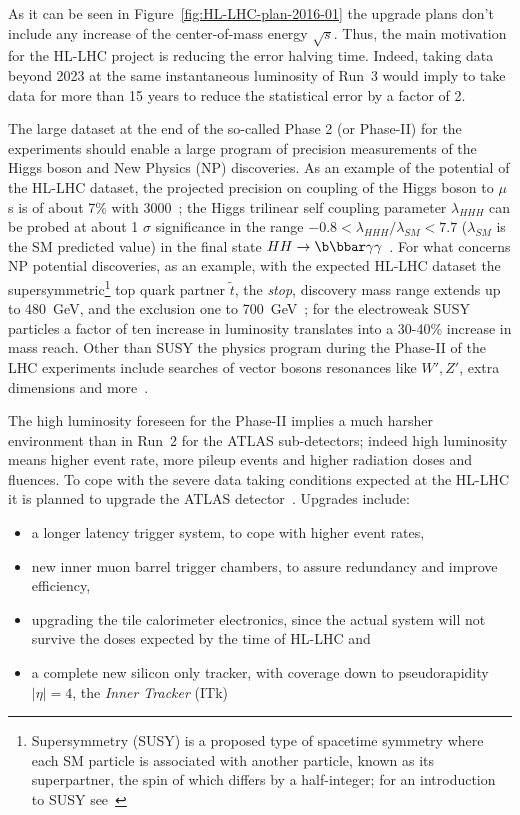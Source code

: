 As it can be seen in Figure~\ref{fig:HL-LHC-plan-2016-01} the upgrade plans don't include any increase 
of the center-of-mass energy $\sqrt{s}$. Thus, the main motivation for the HL-LHC project is 
reducing the error halving time. Indeed, taking data beyond 2023 at the same instantaneous luminosity of 
Run~3 would imply  to take data for more than 15 years to reduce the statistical error by a factor of 2.

The large dataset at the end of the so-called Phase 2 (or {\it} Phase-II) for the experiments should enable 
a  large program of precision measurements of the Higgs boson and New Physics (NP) discoveries. 
As an example of the potential of the HL-LHC dataset, the projected precision on coupling of the Higgs
 boson to $\mu$s is of about 7\% with  3000~\invfb; the Higgs 
trilinear self coupling parameter $\lambda_{HHH}$ can be probed at about 1 $\sigma$ significance 
in the range $-0.8<\lambda_{HHH}/\lambda_{SM}<7.7$ ($\lambda_{SM}$ is the SM predicted value) 
in the final state $HH\to\b\bbar\gamma\gamma$~\cite{ATL-PHYS-PUB-2014-016}. 
For what concerns NP potential discoveries, as an example, with the expected HL-LHC dataset the 
supersymmetric\footnote{Supersymmetry (SUSY) is a proposed type of spacetime symmetry where  each 
SM particle is associated with another particle, known as its superpartner, the spin of which differs by a 
half-integer; for an introduction to SUSY see~\cite{SusyPrimer}} top quark partner $\widetilde{t}$, 
the {\it stop}, discovery mass range extends up to 480~GeV, and the exclusion one to 700~GeV~\cite{ATL-PHYS-PUB-2016-022};
for the electroweak SUSY particles a factor of ten increase in luminosity translates into a 30-40\% increase in mass reach. Other than SUSY the physics program 
during the Phase-II of the LHC experiments include searches of   vector bosons resonances like 
$W',Z'$, 
extra dimensions and more~\cite{ATLASLoIPhaseII}.

The high luminosity foreseen for the Phase-II implies a much harsher environment than in Run~2 
for the ATLAS sub-detectors; indeed high luminosity means higher event rate, more pileup events 
and higher radiation doses and fluences. 
To cope with the severe data taking conditions expected at the HL-LHC it is planned to 
upgrade the  ATLAS detector~\cite{ATLASLoIPhaseII,ATLASITkScopingDocument}. Upgrades include:

\begin{itemize}
\item a longer latency trigger system, to cope with higher event rates,
\item new inner muon barrel trigger chambers, to assure redundancy and improve efficiency,
\item upgrading the tile calorimeter electronics, since the actual system will not survive the doses expected by the time of HL-LHC and
\item a complete new silicon only tracker, with coverage down to pseudorapidity $|\eta|=4$, the {\it Inner Tracker} (ITk)
\end{itemize} 

